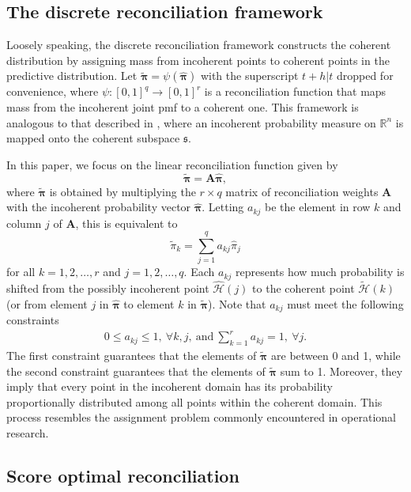 \documentclass[a4paper,review,12pt,authoryear]{elsarticle}
\newcommand{\bpi}{\bm{\pi}}
\theoremstyle{definition}
\begin{document}
    \subsection{The discrete reconciliation framework}

    Loosely speaking, the discrete reconciliation framework constructs the coherent distribution by assigning mass from incoherent points to coherent points in the predictive distribution.
    Let $\tilde{\bpi} = \psi(\hat{\bpi})$ with the superscript $t+h|t$ dropped for convenience, where $\psi:[0,1]^q \rightarrow [0,1]^r$ is a reconciliation function that maps mass from the incoherent joint pmf to a coherent one.
    This framework is analogous to that described in \cite{panagiotelisProbabilisticForecastReconciliation2022}, where an incoherent probability measure on $\mathbb{R}^n$ is mapped onto the coherent subspace $\mathfrak{s}$.

    In this paper, we focus on the linear reconciliation function given by
    \begin{equation}
      \label{eq:framework}
    \tilde{\bpi}=\bm{A}\hat{\bpi},
    \end{equation}
    where $\tilde{\bpi}$ is obtained by multiplying the $r \times q$ matrix of reconciliation weights $\bm{A}$ with the incoherent probability vector $\hat{\bpi}$. Letting $a_{kj}$ be the element in row $k$ and column $j$ of $\bm{A}$, this is equivalent to
    \[
      \tilde{\pi}_k=\sum\limits_{j=1}^q a_{kj}\hat{{\pi}}_j
    \]
    for all $k = 1, 2, \dots, r$  and  $j = 1, 2, \dots, q$.
    Each $a_{kj}$ represents how much probability is shifted from the possibly incoherent point $\hat{\mathcal{H}}(j)$ to the coherent point $\tilde{\mathcal{H}}(k)$ (or from element $j$ in $\hat{\bpi}$ to element $k$ in $\tilde{\bpi}$). Note that $a_{kj}$ must meet the following constraints
    \begin{align*}
    0\leq a_{kj} \leq 1 , ~ \forall k, j, ~ \textrm{and} ~
    \sum\limits_{k=1}^r a_{kj} = 1 , ~ \forall j.
    \end{align*}
    The first constraint guarantees that the elements of $\tilde{\bpi}$ are between 0 and 1, while the second constraint guarantees that the elements of $\tilde{\bpi}$ sum to 1.
    Moreover, they imply that every point in the incoherent domain has its probability proportionally distributed among all points within the coherent domain.
    This process resembles the assignment problem commonly encountered in operational research.

    \subsection{Score optimal reconciliation}
    \label{sec:algorithm}
\end{document}
